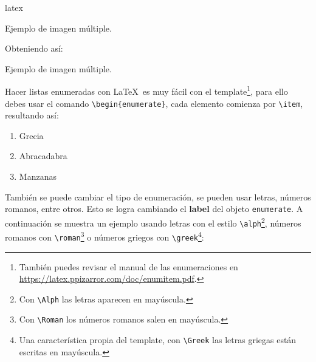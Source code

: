 \begin{sourcecode}{latex}{}
\begin{images}[\label{imagenmultiple}]{Ejemplo de imagen múltiple.}
	\imagesnewline
\end{images}
\end{sourcecode}

	Obteniendo así:

	\begin{images}{Ejemplo de imagen múltiple.}
		\imagesnewline
	\end{images}




	Hacer listas enumeradas con \LaTeX\ es muy fácil con el template\footnote{También puedes revisar el manual de las enumeraciones en \url{https://latex.ppizarror.com/doc/enumitem.pdf}.}, para ello debes usar el comando \texttt{\textbackslash begin\{enumerate\}}, cada elemento comienza por \texttt{\textbackslash item}, resultando así:

	\begin{enumerate}
		\item Grecia
		\item Abracadabra
		\item Manzanas
	\end{enumerate}

	También se puede cambiar el tipo de enumeración, se pueden usar letras, números romanos, entre otros. Esto se logra cambiando el \textbf{label} del objeto \texttt{enumerate}. A continuación se muestra un ejemplo usando letras con el estilo \texttt{\textbackslash alph}\footnote{Con \texttt{\textbackslash Alph} las letras aparecen en mayúscula.}, números romanos con \texttt{\textbackslash roman}\footnote{Con \texttt{\textbackslash Roman} los números romanos salen en mayúscula.} o números griegos con \texttt{\textbackslash greek}\footnote{Una característica propia del template, con \texttt{\textbackslash Greek} las letras griegas están escritas en mayúscula.}:


